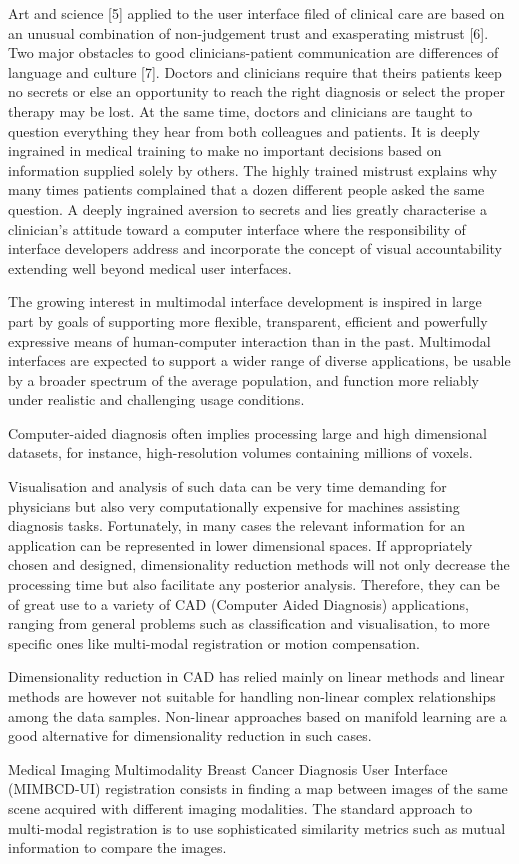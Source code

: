 Art and science [5] applied to the user interface filed of clinical care are based on an unusual combination of non-judgement trust and exasperating mistrust [6]. Two major obstacles to good clinicians-patient communication are differences of language and culture [7]. Doctors and clinicians require that theirs patients keep no secrets or else an opportunity to reach the right diagnosis or select the proper therapy may be lost. At the same time, doctors and clinicians are taught to question everything they hear from both colleagues and patients. It is deeply ingrained in medical training to make no important decisions based on information supplied solely by others. The highly trained mistrust explains why many times patients complained that a dozen different people asked the same question. A deeply ingrained aversion to secrets and lies greatly characterise a clinician’s attitude toward a computer interface where the responsibility of interface developers address and incorporate the concept of visual accountability extending well beyond medical user interfaces.

\clearpage

The growing interest in multimodal interface development is inspired in large part by goals of supporting more flexible, transparent, efficient and powerfully expressive means of human-computer interaction than in the past. Multimodal interfaces are expected to support a wider range of diverse applications, be usable by a broader spectrum of the average population, and function more reliably under realistic and challenging usage conditions.

Computer-aided  diagnosis  often  implies  processing large and high dimensional datasets, for instance, high-resolution volumes containing millions of voxels.

Visualisation and analysis of such data can be very time demanding for physicians but also very computationally expensive for machines assisting diagnosis tasks. Fortunately, in many cases the relevant information for an application can be represented in lower dimensional spaces. If appropriately  chosen and designed, dimensionality reduction methods will not only decrease the processing time but also facilitate any posterior analysis. Therefore, they can be of great use to a variety of CAD (Computer Aided Diagnosis)  applications, ranging  from  general problems such as classification and visualisation, to more specific ones like multi-modal registration or motion compensation.

Dimensionality reduction in CAD has relied mainly on linear methods and linear  methods  are  however not suitable for handling non-linear complex relationships among the data samples. Non-linear approaches based on manifold learning are a good alternative for dimensionality reduction in such cases.

Medical Imaging Multimodality Breast Cancer Diagnosis User Interface (MIMBCD-UI)  registration  consists  in  finding  a map between images of the same scene acquired with different imaging modalities. The standard approach to multi-modal registration is to use sophisticated similarity metrics such as mutual information to compare the images.
